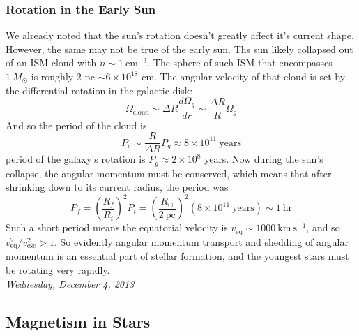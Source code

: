 \documentclass[10pt]{article}
\numberwithin{equation}{section}
\newcommand{\n}{\noindent}
\begin{document}
  \subsubsection{Rotation in the Early Sun} %
  \label{ssub:rotation_in_the_sun}
  We already noted that the sun's rotation doesn't greatly affect it's current
  shape. However, the same may not be true of the early sun. Ths sun likely
  collapsed out of an ISM cloud with $n\sim 1\ \mathrm{cm^{-3}}$. The sphere of
  such ISM that encompasses $1\ M_\odot$ is roughly 2 pc $\sim 6\times 10^{18}$
  cm. The angular velocity of that cloud is set by the differential rotation in
  the galactic disk:
  \begin{equation}
    \label{eq:sunRot:1} \Omega_{\mathrm{cloud}} \sim \Delta R
    \frac{d\Omega_g}{dr} \sim \frac{\Delta R}{R}\Omega_g
  \end{equation}
  And so the period of the cloud is
  \begin{equation}
    \label{eq:sunRot:2} P_c \sim \frac{R}{\Delta R}P_g \approx 8\times 10^{11}\
    \mathrm{years}
  \end{equation}
  period of the galaxy's rotation is $P_g\approx 2\times 10^8$ years. Now
  during the sun's collapse, the angular momentum must be conserved, which
  means that after shrinking down to its current radius, the period was
  \begin{equation}
    \label{eq:sunRot:3} P_f = \left(\frac{R_f}{R_i}\right)^2P_i =
    \left(\frac{R_\odot}{2\ \mathrm{pc}}\right)^2(8\times 10^{11}\
    \mathrm{years}) \sim 1\ \mathrm{hr}
  \end{equation}
  Such a short period means the equatorial velocity is $v_{\mathrm{eq}} \sim
  1000\ \mathrm{km\ s^{-1}}$, and so $v_{\mathrm{eq}}^2 / v_{\mathrm{esc}}^2 >
  1$. So evidently angular momentum transport and shedding of angular momentum
  is an essential part of stellar formation, and the youngest stars must be
  rotating very rapidly.\\

  \n \textit{Wednesday, December 4, 2013}
  \subsection{Magnetism in Stars} %
  \label{sub:magnetism_in_stars}
\end{document}
